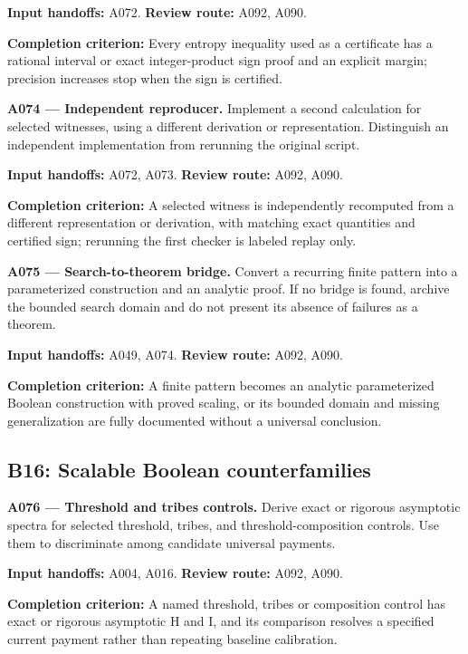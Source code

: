 \documentclass[11pt]{article}
\begin{document}
{\small\color{ink}\textbf{Input handoffs:} A072. \textbf{Review route:} A092, A090.\par
\textbf{Completion criterion:} Every entropy inequality used as a certificate has a rational interval or exact integer-product sign proof and an explicit margin; precision increases stop when the sign is certified.\par}



\textbf{A074 --- Independent reproducer.} Implement a second calculation for selected witnesses, using a different derivation or representation. Distinguish an independent implementation from rerunning the original script.

{\small\color{ink}\textbf{Input handoffs:} A072, A073. \textbf{Review route:} A092, A090.\par
\textbf{Completion criterion:} A selected witness is independently recomputed from a different representation or derivation, with matching exact quantities and certified sign; rerunning the first checker is labeled replay only.\par}



\textbf{A075 --- Search-to-theorem bridge.} Convert a recurring finite pattern into a parameterized construction and an analytic proof. If no bridge is found, archive the bounded search domain and do not present its absence of failures as a theorem.

{\small\color{ink}\textbf{Input handoffs:} A049, A074. \textbf{Review route:} A092, A090.\par
\textbf{Completion criterion:} A finite pattern becomes an analytic parameterized Boolean construction with proved scaling, or its bounded domain and missing generalization are fully documented without a universal conclusion.\par}



\subsection{B16: Scalable Boolean counterfamilies}

\textbf{A076 --- Threshold and tribes controls.} Derive exact or rigorous asymptotic spectra for selected threshold, tribes, and threshold-composition controls. Use them to discriminate among candidate universal payments.

{\small\color{ink}\textbf{Input handoffs:} A004, A016. \textbf{Review route:} A092, A090.\par
\textbf{Completion criterion:} A named threshold, tribes or composition control has exact or rigorous asymptotic H and I, and its comparison resolves a specified current payment rather than repeating baseline calibration.\par}
\end{document}
